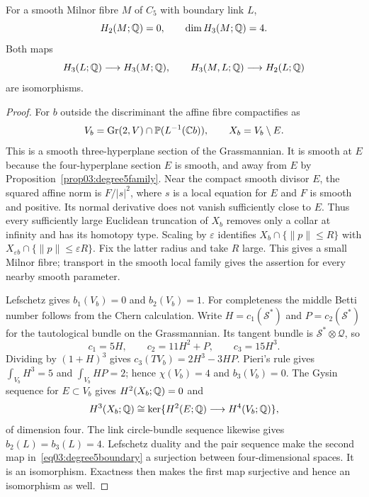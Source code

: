 \begin{lemma}\label{lem03:degree5milnor}
For a smooth Milnor fibre $M$ of $C_5$ with boundary link $L$,
\[
 H_2(M;\mathbb{Q})=0,\qquad \dim H_3(M;\mathbb{Q})=4.
\]
Both maps
\begin{equation}\label{eq03:degree5boundary}
 H_3(L;\mathbb{Q})\longrightarrow H_3(M;\mathbb{Q}),\qquad
 H_3(M,L;\mathbb{Q})\longrightarrow H_2(L;\mathbb{Q})
\end{equation}
are isomorphisms.
\end{lemma}

\begin{proof}
For $b$ outside the discriminant the affine fibre compactifies as
\[
 V_b=\operatorname{Gr}(2,V)\cap\mathbb{P}(L^{-1}(\mathbb{C} b)),
 \qquad X_b=V_b\setminus E.
\]
This is a smooth three-hyperplane section of the Grassmannian.
It is smooth at $E$ because the four-hyperplane section $E$ is
smooth, and away from $E$ by Proposition~\ref{prop03:degree5family}.
Near the compact smooth divisor $E$, the squared affine norm is
$F/|s|^2$, where $s$ is a local equation for $E$ and $F$ is
smooth and positive.  Its normal derivative does not vanish
sufficiently close to $E$.  Thus every sufficiently large
Euclidean truncation of $X_b$ removes only a collar at infinity
and has its homotopy type.  Scaling by $\varepsilon$ identifies
$X_b\cap\{\|p\|\le R\}$ with
$X_{\varepsilon b}\cap\{\|p\|\le\varepsilon R\}$.
Fix the latter radius and take $R$ large.  This gives a small
Milnor fibre; transport in the smooth local family gives the
assertion for every nearby smooth parameter.

Lefschetz gives $b_1(V_b)=0$ and $b_2(V_b)=1$.
For completeness the middle Betti number follows from the Chern
calculation.  Write $H=c_1(\mathcal S^*)$ and
$P=c_2(\mathcal S^*)$ for the tautological bundle on the
Grassmannian.  Its tangent bundle is $\mathcal S^*\otimes\mathcal Q$,
so
\[
 c_1=5H,\qquad c_2=11H^2+P,\qquad c_3=15H^3.
\]
Dividing by $(1+H)^3$ gives $c_3(TV_b)=2H^3-3HP$.
Pieri's rule gives
$\int_{V_b}H^3=5$ and $\int_{V_b}HP=2$; hence
$\chi(V_b)=4$ and $b_3(V_b)=0$.
The Gysin sequence for $E\subset V_b$ gives
$H^2(X_b;\mathbb{Q})=0$ and
\[
 H^3(X_b;\mathbb{Q})\cong
 \ker\{H^2(E;\mathbb{Q})\longrightarrow H^4(V_b;\mathbb{Q})\},
\]
of dimension four.  The link circle-bundle sequence likewise
gives $b_2(L)=b_3(L)=4$.  Lefschetz duality and the pair sequence
make the second map in~\eqref{eq03:degree5boundary} a surjection
between four-dimensional spaces.  It is an isomorphism.  Exactness
then makes the first map surjective and hence an isomorphism as well.
\end{proof}

